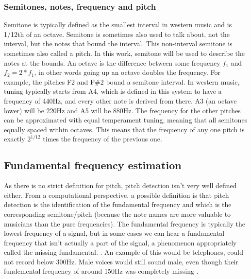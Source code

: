 \subsubsection{Semitones, notes, frequency and pitch}
Semitone is typically defined as the smallest interval in western music and is 1/12th of an octave. Semitone is sometimes also used to talk about, not the interval, but the notes that bound the interval. This non-interval semitone is sometimes also called a pitch. In this work, semitone will be used to describe the notes at the bounds.   
An octave is the difference between some frequency $f_1$ and $f_2 = 2*f_1$, in other words going up an octave doubles the frequency. For example, the pitches F2 and F\#2 bound a semitone interval. In western music, tuning typically starts from A4, which is defined in this system to have a frequency of 440Hz, and every other note is derived from there. A3 (an octave lower) will be 220Hz and A5 will be 880Hz. The frequency for the other pitches can be approximated with equal temperament tuning, meaning that all semitones equally spaced within octaves. This means that the frequency of any one pitch is exactly $2^{1/12}$ times the frequency of the previous one. 

% 
\subsection{Fundamental frequency estimation}
As there is no strict definition for pitch, pitch detection isn't very well defined either. From a computational perspective, a possible definition is that pitch detection is the identification of the fundamental frequency and which is the corresponding semitone/pitch (because the note names are more valuable to musicians than the pure frequencies). The fundamental frequency is typically the lowest frequency of a signal, but in some cases we can hear a fundamental frequency that isn't actually a part of the signal, a phenomenon appropriately called the missing fundamental. . An example of this would be telephones, could not record below 300Hz. Male voices would still sound male, even though their fundemental frequency of around 150Hz was completely missing . 

